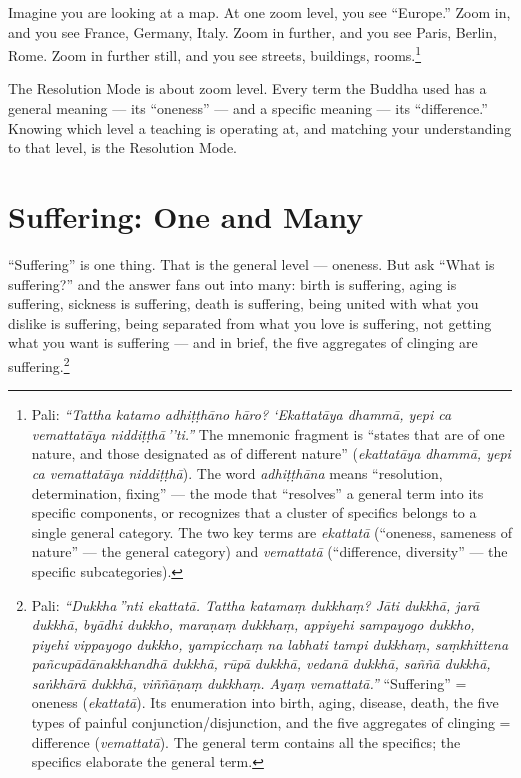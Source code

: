 \noindent Imagine you are looking at a map. At one zoom level, you see ``Europe.'' Zoom in, and you see France, Germany, Italy. Zoom in further, and you see Paris, Berlin, Rome. Zoom in further still, and you see streets, buildings, rooms.\footnote{Pali: \textit{``Tattha katamo adhiṭṭhāno hāro? `Ekattatāya dhammā, yepi ca vemattatāya niddiṭṭhā\,''ti.''} The mnemonic fragment is ``states that are of one nature, and those designated as of different nature'' (\textit{ekattatāya dhammā, yepi ca vemattatāya niddiṭṭhā}). The word \textit{adhiṭṭhāna} means ``resolution, determination, fixing'' --- the mode that ``resolves'' a general term into its specific components, or recognizes that a cluster of specifics belongs to a single general category. The two key terms are \textit{ekattatā} (``oneness, sameness of nature'' --- the general category) and \textit{vemattatā} (``difference, diversity'' --- the specific subcategories).}

The Resolution Mode is about zoom level. Every term the Buddha used has a general meaning --- its ``oneness'' --- and a specific meaning --- its ``difference.'' Knowing which level a teaching is operating at, and matching your understanding to that level, is the Resolution Mode.

\section*{Suffering: One and Many}

``Suffering'' is one thing. That is the general level --- oneness. But ask ``What is suffering?'' and the answer fans out into many: birth is suffering, aging is suffering, sickness is suffering, death is suffering, being united with what you dislike is suffering, being separated from what you love is suffering, not getting what you want is suffering --- and in brief, the five aggregates of clinging are suffering.\footnote{Pali: \textit{``Dukkha\,''nti ekattatā. Tattha katamaṃ dukkhaṃ? Jāti dukkhā, jarā dukkhā, byādhi dukkho, maraṇaṃ dukkhaṃ, appiyehi sampayogo dukkho, piyehi vippayogo dukkho, yampicchaṃ na labhati tampi dukkhaṃ, saṃkhittena pañcupādānakkhandhā dukkhā, rūpā dukkhā, vedanā dukkhā, saññā dukkhā, saṅkhārā dukkhā, viññāṇaṃ dukkhaṃ. Ayaṃ vemattatā.''} ``Suffering'' = oneness (\textit{ekattatā}). Its enumeration into birth, aging, disease, death, the five types of painful conjunction/disjunction, and the five aggregates of clinging = difference (\textit{vemattatā}). The general term contains all the specifics; the specifics elaborate the general term.}

